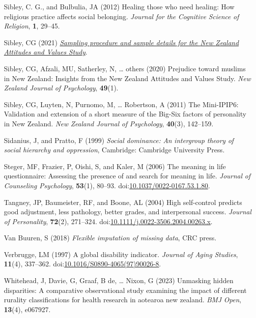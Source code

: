 \documentclass[
  single column]{article}
\newlength{\cslhangindent}
\newenvironment{CSLReferences}[2] %
 {\begin{list}{}{%
  \setlength{\itemindent}{0pt}
  \setlength{\leftmargin}{0pt}
  \setlength{\parsep}{0pt}
  \ifodd #1
   \setlength{\leftmargin}{\cslhangindent}
   \setlength{\itemindent}{-1\cslhangindent}
  \fi
  \setlength{\itemsep}{#2\baselineskip}}}
 {\end{list}}
\begin{document}
\begin{CSLReferences}{1}{0}
Sibley, C. G., and Bulbulia, JA (2012) Healing those who need healing:
How religious practice affects social belonging. \emph{Journal for the
Cognitive Science of Religion}, \textbf{1}, 29--45.

Sibley, CG (2021)
\emph{\href{https://doi.org/10.31234/osf.io/wgqvy}{Sampling procedure
and sample details for the {N}ew {Z}ealand {A}ttitudes and {V}alues
{S}tudy}}.

Sibley, CG, Afzali, MU, Satherley, N, \ldots{} others (2020) Prejudice
toward muslims in {N}ew {Z}ealand: Insights from the {N}ew {Z}ealand
{A}ttitudes and {V}alues {S}tudy. \emph{New Zealand Journal of
Psychology}, \textbf{49}(1).

Sibley, CG, Luyten, N, Purnomo, M, \ldots{} Robertson, A (2011) The
Mini-IPIP6: Validation and extension of a short measure of the Big-Six
factors of personality in {N}ew {Z}ealand. \emph{New Zealand Journal of
Psychology}, \textbf{40}(3), 142--159.

Sidanius, J, and Pratto, F (1999) \emph{Social dominance: An intergroup
theory of social hierarchy and oppression}, Cambridge: Cambridge
University Press.

Steger, MF, Frazier, P, Oishi, S, and Kaler, M (2006) The meaning in
life questionnaire: Assessing the presence of and search for meaning in
life. \emph{Journal of Counseling Psychology}, \textbf{53}(1), 80--93.
doi:\href{https://doi.org/10.1037/0022-0167.53.1.80}{10.1037/0022-0167.53.1.80}.

Tangney, JP, Baumeister, RF, and Boone, AL (2004) High self-control
predicts good adjustment, less pathology, better grades, and
interpersonal success. \emph{Journal of Personality}, \textbf{72}(2),
271--324.
doi:\href{https://doi.org/10.1111/j.0022-3506.2004.00263.x}{10.1111/j.0022-3506.2004.00263.x}.

Van Buuren, S (2018) \emph{Flexible imputation of missing data}, CRC
press.

Verbrugge, LM (1997) A global disability indicator. \emph{Journal of
Aging Studies}, \textbf{11}(4), 337--362.
doi:\href{https://doi.org/10.1016/S0890-4065(97)90026-8}{10.1016/S0890-4065(97)90026-8}.

Whitehead, J, Davie, G, Graaf, B de, \ldots{} Nixon, G (2023) Unmasking
hidden disparities: A comparative observational study examining the
impact of different rurality classifications for health research in
aotearoa new zealand. \emph{BMJ Open}, \textbf{13}(4), e067927.

\end{CSLReferences}
\end{document}
